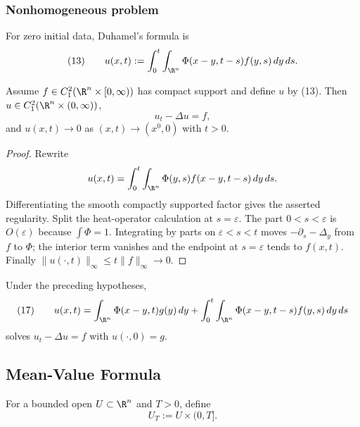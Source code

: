 \subsubsection{Nonhomogeneous problem}
\label{sec:heat-nonhomogeneous-problem}

For zero initial data, Duhamel's formula is
$$(13)\qquad
u(x,t):=\int_0^t\int_{\R^n}
\Phi(x-y,t-s)f(y,s)\,dy\,ds.$$

\begin{theorem}
\label{thm:heat-equation-nonhomogeneous-solution}
Assume $f\in C_1^2(\R^n\times[0,\infty))$ has compact support and define
$u$ by (13). Then $u\in C_1^2(\R^n\times(0,\infty))$,
$$u_t-\Delta u=f,$$
and $u(x,t)\to0$ as $(x,t)\to(x^0,0)$ with $t>0$.
\end{theorem}
\begin{proof}
\sketch Rewrite
$$u(x,t)=\int_0^t\int_{\R^n}\Phi(y,s)f(x-y,t-s)\,dy\,ds.$$
Differentiating the smooth compactly supported factor gives the asserted
regularity. Split the heat-operator calculation at $s=\varepsilon$. The part
$0<s<\varepsilon$ is $O(\varepsilon)$ because $\int\Phi=1$. Integrating by
parts on $\varepsilon<s<t$ moves $-\partial_s-\Delta_y$ from $f$ to $\Phi$;
the interior term vanishes and the endpoint at $s=\varepsilon$ tends to
$f(x,t)$. Finally
$\|u(\cdot,t)\|_\infty\le t\|f\|_\infty\to0$.
\end{proof}

\begin{remark}
\label{rem:heat-equation-duhamel-combined}
Under the preceding hypotheses,
$$(17)\qquad
u(x,t)=\int_{\R^n}\Phi(x-y,t)g(y)\,dy
+\int_0^t\int_{\R^n}\Phi(x-y,t-s)f(y,s)\,dy\,ds$$
solves $u_t-\Delta u=f$ with $u(\cdot,0)=g$.
\end{remark}

\subsection{Mean-Value Formula}
\label{sec:heat-mean-value-formula}

\begin{definition}
\label{def:parabolic-cylinder-heat-ball}
\leanok
For a bounded open $U\subset\R^n$ and $T>0$, define
$$U_T:=U\times(0,T].$$
\end{definition}

